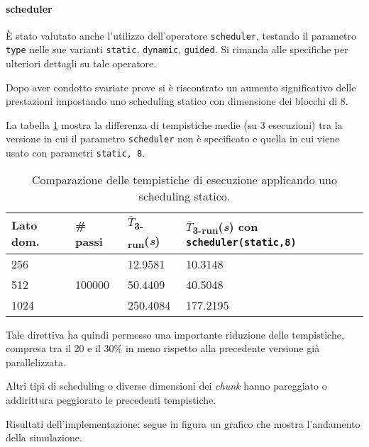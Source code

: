 \paragraph{scheduler}

È stato valutato anche l'utilizzo dell'operatore \texttt{scheduler}, testando il
parametro \texttt{type} nelle sue varianti \texttt{static}, \texttt{dynamic},
\texttt{guided}.
Si rimanda alle specifiche \cite{openmp2018reference} per ulteriori dettagli su
tale operatore.

Dopo aver condotto svariate prove si è riscontrato un aumento significativo
delle prestazioni impostando uno scheduling statico con dimensione dei blocchi
di 8.

La tabella \ref{tab:scheduler} mostra la differenza di tempistiche medie (su 3
esecuzioni) tra la versione in cui il parametro \texttt{scheduler} non è
specificato e quella in cui viene usato con parametri \texttt{static, 8}.

\begin{table}[ht]
\begin{tabularx}{\linewidth}{XXXX}
\toprule
Lato dom. & \# passi & $\overline{T}$\textsubscript{3-run}(\textit{s})&
$\overline{T}$\textsubscript{3-run}(\textit{s}) con \texttt{scheduler(static,8)}\\
\midrule
 256 & \multirow{3}{*}{100000} & 12.9581 & 10.3148 \\
 512 && 50.4409 & 40.5048 \\
 1024 && 250.4084 & 177.2195 \\
\bottomrule
\end{tabularx}
\caption{\label{tab:scheduler}Comparazione delle tempistiche di esecuzione
applicando uno scheduling statico.}
\end{table}

Tale direttiva ha quindi permesso una importante riduzione delle tempistiche,
compresa tra il 20 e il 30\% in meno rispetto alla precedente versione già
parallelizzata.

Altri tipi di scheduling o diverse dimensioni dei \textit{chunk} hanno
pareggiato o addirittura peggiorato le precedenti tempistiche.


Risultati dell'implementazione: segue in figura un grafico che mostra
l'andamento della simulazione.

